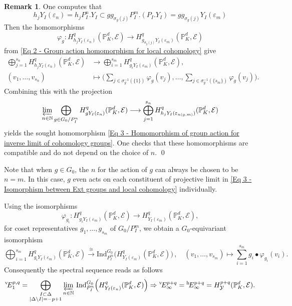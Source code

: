 \documentclass[a4paper, reqno, 10pt]{amsart}
\theoremstyle{definition}
\newtheorem{remark}[theorem]{Remark}
\numberwithin{equation}{section}
\newcommand{\abs}[1]{{\lvert{#1}\rvert}}
\newcommand{\Ind}{{\mathrm{Ind}}}
\newcommand{\lra}{\longrightarrow}
\newcommand{\lto}{\longmapsto}
\newcommand{\BN}{{\mathbb {N}}}
\newcommand{\BP}{{\mathbb {P}}}
\newcommand{\CE}{{\mathcal {E}}}
\newcommand{\CY}{{\mathcal {Y}}}
\begin{document}
\begin{remark}
	
	One computes that
	\begin{equation*}
		h_j Y_I (\varepsilon_{n}) = h_j P^{n}_I . Y_I 
		\subset g g_{\sigma_g(j)} P^m_I . ( P_I . Y_I )
		= g g_{\sigma_g(j)} Y_I(\varepsilon_m)
	\end{equation*}
	Then the homomorphisms
	\begin{equation*}
		\varphi_g \colon H^q_{h_j Y_I(\varepsilon_{n})} (\BP_K^d, \CE) \lra H^q_{g_{\sigma_g(j)} Y_I(\varepsilon_m)} (\BP_K^d, \CE)
	\end{equation*}
	from \eqref{Eq 2 - Group action homomorphism for local cohomology} give
	\begin{align*}
		\bigoplus_{j=1}^{s_{n}} H^q_{h_j Y_I(\varepsilon_{n})} (\BP_K^d, \CE) &\lra \bigoplus_{i=1}^{s_m} H^q_{g_i Y_I(\varepsilon_m)} (\BP_K^d, \CE) , \\
		(v_1,\ldots,v_{s_n}) &\lto \Big(\sum_{j\in \sigma_g^{-1}(\{1\})} \varphi_g(v_{j}) ,\ldots, \sum_{j\in \sigma_g^{-1}(\{s_m\})} \varphi_g(v_{j}) \Big) .
	\end{align*}
	Combining this with the projection 
	\begin{equation*}
		\varprojlim_{n\in \BN} \bigoplus_{g \in G_0/P_I^n} H^q_{g Y_I(\varepsilon_n)} (\BP_K^d, \CE) \lra \bigoplus_{j=1}^{s_{n}} H^q_{h_j Y_I(\varepsilon_{n(g,m)})} (\BP_K^d, \CE)
	\end{equation*}
	yields the sought homomorphism \eqref{Eq 3 - Homomorphism of group action for inverse limit of cohomology groups}.
	One checks that these homomorphisms are compatible and do not depend on the choice of $n$.
	\qed
\end{remark}


Note that when $g\in G_0$, the $n$ for the action of $g$ can always be chosen to be $n=m$.
In this case, $g$ even acts on each constituent of projective limit in \eqref{Eq 3 - Isomorphism between Ext groups and local cohomology} individually.

Using the isomorphisms 
\begin{equation*}
	\varphi_{g_i} \colon H^q_{g_i Y_I(\varepsilon_m)} (\BP_K^d, \CE) \lra H^q_{ Y_I(\varepsilon_m)} (\BP_K^d, \CE), 
\end{equation*}
for coset representatives $g_1,\ldots, g_{s_m}$ of $G_0/P_I^m$, we obtain a $G_0$-equivariant isomorphism
\begin{equation*}
	\bigoplus_{i=1}^{s_m} H^q_{g_i Y_I(\varepsilon_m)} (\BP_K^d, \CE) \overset{\cong}{\lra} \Ind_{P_{I}^m}^{G_0} \Big( H^q_{Y_I(\varepsilon_m)} (\BP_K^d, \CE) \Big) \,,\quad
	(v_1,\ldots,v_{s_m}) \lto \sum_{i=1}^{s_m} g_i \bullet \varphi_{g_i} (v_i) .
\end{equation*}
Consequently the spectral sequence reads as follows
\begin{equation*}
	^{\rm v}\! E_1^{p,q} = \bigoplus\limits_{\substack{I\subset \Delta \\ \abs{\Delta\setminus I}=-p+1}} \varprojlim_{n\in \BN} \,\Ind^{G_0}_{P_I^n} \Big( H^q_{Y_I(\varepsilon_n)} (\BP_K^d, \CE) \Big)
	\Rightarrow {}^{\rm v}\!E_\infty^{p+q} = {}^{\rm h}\!E_\infty^{p+q} = H^{p+q}_\CY (\BP_K^d, \CE) .
\end{equation*}
\end{document}
